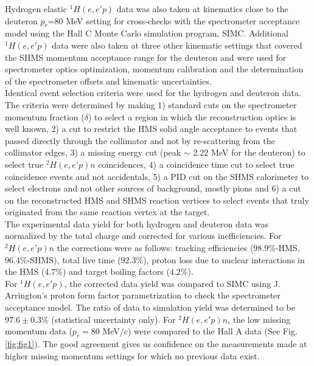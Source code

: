 \indent Hydrogen elastic $^{1}H(e,e'p)$ data was also taken at kinematics close to the deuteron $p_{r}$=80 MeV setting for cross-checks with the spectrometer acceptance model using the  Hall C Monte Carlo
simulation program, SIMC. Additional $^{1}H(e,e'p)$ data were also taken at three other kinematic settings that covered the SHMS momentum acceptance range for the deuteron and were used for spectrometer optics optimization, 
momentum calibration and the determination of the spectrometer offsets and kinematic uncertainties\cite{cyero_specKinUnc,cyero_SHMSOptics}. \\
\indent Identical event selection criteria were used for the hydrogen and deuteron data. The criteria were determined by making 1) standard cuts on the spectrometer momentum fraction ($\delta$) to select a region in which the reconstruction optics
is well known, 2) a cut to restrict the HMS solid angle acceptance to events that passed directly through the collimator and not by re-scattering from the collimator edges, 3) a missing
energy cut (peak $\sim$ 2.22 MeV for the deuteron) to select true $^{2}H(e,e'p)n$ coincidences, 4) a coincidence time cut to select true coincidence events and not accidentals,  5) a PID cut on the
SHMS calorimeter to select electrons and not other sources of background, mostly pions and 6) a cut on the reconstructed HMS and SHMS reaction vertices to select events that truly
originated from the same reaction vertex at the target. \\
\indent The experimental data yield for both hydrogen and deuteron data was normalized by the total charge and corrected for various inefficiencies. For $^{2}H(e,e'p)n$ the corrections were as follows: tracking efficiencies ($98.9 \%$-HMS, $96.4 \%$-SHMS),
total live time ($92.3 \%$), proton loss due to nuclear interactions in the HMS ($4.7 \%$)\cite{cyero_pAbs} and target boiling factors ($4.2 \%$)\cite{cyero_tgtBoil}. \\
\indent For $^{1}H(e,e'p)$, the corrected data yield was compared to SIMC using J. Arrington's proton form factor parametrization\cite{PhysRevC.69.022201} to check the spectrometer acceptance
model. The ratio of data to simulation yield was determined to be $97.6\pm0.3 \%$ (statistical uncertainty only). For $^{2}H(e,e'p)n$, the low missing momentum data ($p_{r}=80$ MeV/c) were compared to the Hall A data (See Fig. \ref{fig:fig1}).
The good agreement gives us confidence on the measurements made at higher missing momentum settings for which no previous data exist. \\
